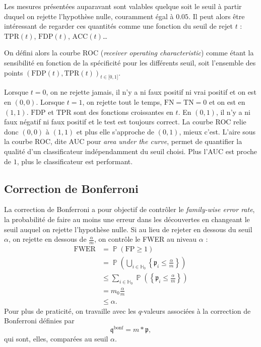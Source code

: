 \documentclass[12pt,a4paper]{reedthesis}
\DeclareMathOperator*{\prob}{\mathbb{P}}
\newcommand \PP [1]{\prob\left({#1}\right)}
\newcommand \pv {\mathfrak{p}}
\newcommand \qv {\mathfrak{q}}
\theoremstyle{definition}
\theoremstyle{definition}
\theoremstyle{definition}
\theoremstyle{remark}
\begin{document}
Les mesures présentées auparavant sont valables quelque soit le seuil à partir duquel on rejette l'hypothèse nulle, couramment égal à \(0.05\). Il peut alors être intéressant de regarder ces quantités comme une fonction du seuil de rejet \(t\) : \(\text{TPR}(t)\), \(\text{FDP}(t)\), \(\text{ACC}(t)\)\ldots{}

On défini alors la courbe ROC (\emph{receiver operating characteristic}) comme étant la sensibilité en fonction de la spécificité pour les différents seuil, soit l'ensemble des points \(\left(\text{FDP}(t), \text{TPR}(t)\right)_{t\in\mathopen[0,1\mathclose]}\).

Lorsque \(t=0\), on ne rejette jamais, il n'y a ni faux positif ni vrai positif et on est en \((0,0)\). Lorsque \(t=1\), on rejette tout le temps, \(\text{FN} = \text{TN} = 0\) et on est en \((1,1)\). \(\text{FDP}\) et \(\text{TPR}\) sont des fonctions croissantes en \(t\). En \((0,1)\), il n'y a ni faux négatif ni faux positif et le test est toujours correct. La courbe ROC relie donc \((0,0)\) à \((1,1)\) et plus elle s'approche de \((0,1)\), mieux c'est. L'aire sous la courbe ROC, dite AUC pour \emph{area under the curve}, permet de quantifier la qualité d'un classificateur indépendamment du seuil choisi. Plus l'AUC est proche de \(1\), plus le classificateur est performant.

\hypertarget{correction-de-bonferroni}{%
\subsection{Correction de Bonferroni}\label{correction-de-bonferroni}}

La correction de Bonferroni a pour objectif de contrôler le \emph{family-wise error rate}, la probabilité de faire au moins une erreur dans les découvertes en changeant le seuil auquel on rejette l'hypothèse nulle. Si au lieu de rejeter en dessous du seuil \(\alpha\), on rejette en dessous de \(\frac{\alpha}{m}\), on contrôle le FWER au niveau \(\alpha\) :
\begin{align*}
\text{FWER} & = \PP{\text{FP} \geq 1} \\
& = \PP{\bigcup_{i\in \mathbb{H}_0} \left\{\pv_i \leq \frac{\alpha}{m}\right\} } \\
& \leq \sum_{i\in \mathbb{H}_0} \PP{\left\{\pv_i \leq \frac{\alpha}{m} \right\}} \\
& = m_0 \frac{\alpha}{m}  \\
& \leq \alpha.
\end{align*}
Pour plus de praticité, on travaille avec les \(q\)-valeurs associées à la correction de Bonferroni définies par
\begin{equation*}
\qv^{\text{bonf}} = m * \pv,
\end{equation*}
qui sont, elles, comparées au seuil \(\alpha\).
\end{document}
